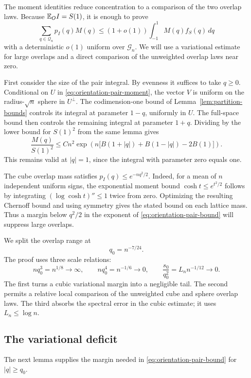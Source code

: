 The moment identities reduce concentration to a comparison of the two
overlap laws. Because $\mathbb E_O I=S(1)$, it is enough to prove
\[
 \sum_{q\in\mathcal Q_n}p_I(q)M(q)
 \le (1+o(1))\int_{-1}^1 M(q)f_S(q)\,dq
\]
with a deterministic $o(1)$ uniform over $\mathcal G_n$. We will use a
variational estimate for large overlaps and a direct comparison of the
unweighted overlap laws near zero.

First consider the size of the pair integral. By evenness it suffices
to take $q\ge0$. Conditional on $U$ in
\eqref{eq:orientation-pair-moment}, the vector $V$ is uniform on the
radius-$\sqrt n$ sphere in $U^\perp$. The codimension-one bound of
Lemma~\ref{lem:partition-bounds} controls its integral at parameter
$1-q$, uniformly in $U$. The full-space bound then controls the
remaining integral at parameter $1+q$. Dividing by the lower bound for
$S(1)^2$ from the same lemma gives
\begin{equation}
 \frac{M(q)}{S(1)^2}
 \le Cn^2\exp\!\left(n\bigl[B(1+|q|)+B(1-|q|)-2B(1)\bigr]\right).
 \label{eq:orientation-pair-bound}
\end{equation}
This remains valid at $|q|=1$, since the integral with parameter zero
equals one.

The cube overlap mass satisfies $p_I(q)\le e^{-nq^2/2}$. Indeed, for a
mean of $n$ independent uniform signs, the exponential moment bound
$\cosh t\le e^{t^2/2}$ follows by integrating
$(\log\cosh t)''\le1$ twice from zero. Optimizing the resulting Chernoff
bound and using symmetry gives the stated bound on each lattice mass.
Thus a margin below $q^2/2$ in the exponent of
\eqref{eq:orientation-pair-bound} will suppress large overlaps.

We split the overlap range at
\[
 q_0=n^{-7/24}.
\]
The proof uses three scale relations:
\[
 nq_0^3=n^{1/8}\longrightarrow\infty,\qquad
 nq_0^4=n^{-1/6}\longrightarrow0,\qquad
 \frac{s_0}{q_0^2}=L_n n^{-1/12}\longrightarrow0.
\]
The first turns a cubic variational margin into a negligible tail. The
second permits a relative local comparison of the unweighted cube and
sphere overlap laws. The third absorbs the spectral error in the cubic
estimate; it uses $L_n\le\log n$.

\subsection{The variational deficit}

The next lemma supplies the margin needed in
\eqref{eq:orientation-pair-bound} for $|q|\ge q_0$.

